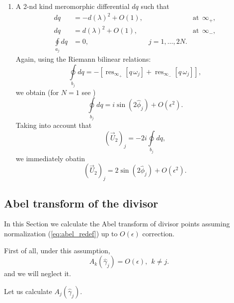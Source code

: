 \documentclass[12pt]{article}
\newcommand{\res}{\mathop{\mathrm{res}}}
\newtheorem{remark}{Remark}
\begin{document}
\begin{enumerate}
\begin{remark}
If the finite-gap approximation is constructed using some periodicity preserving technique, for example the isoperiodic deformation from \cite{GrSch}, then, instead of (\ref{eq:dp_per1}), we have an \textbf{exact} relation:
\begin{equation}
\label{eq:dp_per2}
\oint\limits_{a_j}dp=2\cos(\hat\phi_n).
\end{equation}
Otherwise, if we close the gaps corresponding to the stable modes ``naively'', the spatial periodicity of the leading order solution  breaks at $O(\epsilon^2)$.
\end{remark}
\item A 2-nd kind meromorphic differential $dq$ such that
\begin{align*}
dq &= -d(\lambda)^2 +O(1),& &\mbox{at} \ \ \infty_+,\\
dq &=  d(\lambda)^2 +O(1),& &\mbox{at} \ \ \infty_-,\\ 
\oint\limits_{a_j}dq &=0,&  j=1,\ldots,2N.
\end{align*} 
Again, using the Riemann bilinear relations:
$$
\oint\limits_{b_j}dq=- \left[\res\nolimits_{\infty_+} [q\, \omega_j]+ \res\nolimits_{\infty_-} [q\, \omega_j]  \right],
$$
we obtain (for $N=1$ see \cite{GS3})
\begin{equation}
\label{eq:dq_per1}
\oint\limits_{b_j}dq= i\sin(2\hat\phi_j) +O(\epsilon^2).
\end{equation}
Taking into account that 
\begin{equation}
\label{eq:U2}
\left(\vec U_2 \right)_j = - 2i\oint\limits_{b_j}dq,
\end{equation}
we immediately obatin
\begin{equation}
\label{eq:U2bis}
\left(\vec U_2 \right)_j=2\sin(2\hat\phi_j) +O(\epsilon^2).
\end{equation}
\end{enumerate}


\subsection{Abel transform of the divisor}
\label{sec:sec5.4}

In this Section we calculate the Abel transform of divisor points assuming normalization (\ref{eq:abel_redef}) up to $O(\epsilon)$ correction.

First of all, under this assumption, 
$$
A_k(\hat\gamma_j) = O(\epsilon), \ \ k\ne j.
$$
and we will neglect it.

Let us calculate $A_j(\hat\gamma_j)$. 
\end{document}

